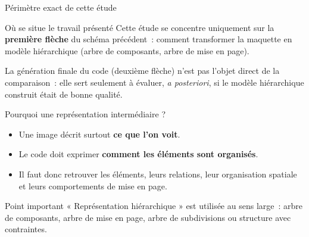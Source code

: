 \documentclass[11pt]{beamer}
\begin{document}
\begin{frame}{Périmètre exact de cette étude}
\begin{alertblock}{Où se situe le travail présenté}
Cette étude se concentre uniquement sur la \textbf{première flèche} du schéma précédent~: comment transformer la maquette en modèle hiérarchique (arbre de composants, arbre de mise en page).
\end{alertblock}
\begin{center}
\end{center}
La génération finale du code (deuxième flèche) n'est pas l'objet direct de la comparaison~: elle sert seulement à évaluer, \textit{a posteriori}, si le modèle hiérarchique construit était de bonne qualité.
\end{frame}

\begin{frame}{Pourquoi une représentation intermédiaire ?}
\begin{itemize}
\item Une image décrit surtout \textbf{ce que l'on voit}.
\item Le code doit exprimer \textbf{comment les éléments sont organisés}.
\item Il faut donc retrouver les éléments, leurs relations, leur organisation spatiale et leurs comportements de mise en page.
\end{itemize}
\begin{block}{Point important}
« Représentation hiérarchique » est utilisée au sens large~: arbre de composants, arbre de mise en page, arbre de subdivisions ou structure avec contraintes.
\end{block}
\end{frame}

\end{document}

